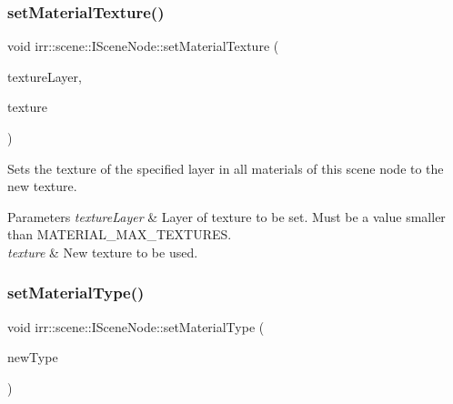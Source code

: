 \subsubsection{\texorpdfstring{set\+Material\+Texture()}{setMaterialTexture()}\hspace{0.1cm}{\footnotesize\ttfamily [2/2]}}
{\footnotesize\ttfamily void irr\+::scene\+::\+I\+Scene\+Node\+::set\+Material\+Texture (\begin{DoxyParamCaption}\item[{\hyperlink{namespaceirr_a0416a53257075833e7002efd0a18e804}{u32}}]{texture\+Layer,  }\item[{\hyperlink{classirr_1_1video_1_1ITexture}{video\+::\+I\+Texture} $\ast$}]{texture }\end{DoxyParamCaption})\hspace{0.3cm}{\ttfamily [inline]}}



Sets the texture of the specified layer in all materials of this scene node to the new texture. 


\begin{DoxyParams}{Parameters}
{\em texture\+Layer} & Layer of texture to be set. Must be a value smaller than M\+A\+T\+E\+R\+I\+A\+L\+\_\+\+M\+A\+X\+\_\+\+T\+E\+X\+T\+U\+R\+ES. \\
\hline
{\em texture} & New texture to be used. \\
\hline
\end{DoxyParams}
\mbox{\label{classirr_1_1scene_1_1ISceneNode_a302c7dedd776b52111823df5ed8446de}} 
\subsubsection{\texorpdfstring{set\+Material\+Type()}{setMaterialType()}\hspace{0.1cm}{\footnotesize\ttfamily [1/2]}}
{\footnotesize\ttfamily void irr\+::scene\+::\+I\+Scene\+Node\+::set\+Material\+Type (\begin{DoxyParamCaption}\item[{\hyperlink{namespaceirr_1_1video_ac8e9b6c66f7cebabd1a6d30cbc5430f1}{video\+::\+E\+\_\+\+M\+A\+T\+E\+R\+I\+A\+L\+\_\+\+T\+Y\+PE}}]{new\+Type }\end{DoxyParamCaption})\hspace{0.3cm}{\ttfamily [inline]}}



